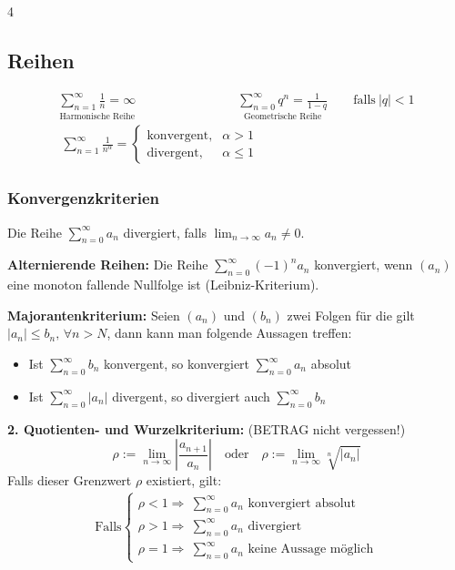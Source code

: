 \documentclass[6pt,a4paper]{scrartcl}
\newcommand{\Ra}[0]{\ensuremath{\Rightarrow}}
\begin{document}
\begin{multicols*}{4}
    \subsection{Reihen}
    \begin{eqnarray*}
        \underset{\text{Harmonische Reihe}}{\sum_{n=1}^\infty \frac{1}{n} = \infty} \qquad \qquad  \qquad \qquad \underset{\text{Geometrische Reihe}}{\sum_{n=0}^\infty q^n = \frac{1}{1-q}} \qquad \text{falls}\ |q|<1
    \end{eqnarray*}
    \begin{eqnarray*}
        \sum_{n=1}^\infty \frac{1}{n^\alpha} = \begin{cases} \text{konvergent}, & \alpha > 1 \\ \text{divergent}, & \alpha \le 1 \end{cases} \qquad \qquad \qquad \qquad \qquad \qquad
    \end{eqnarray*}

    \subsubsection{Konvergenzkriterien}

    Die Reihe $\sum^{\infty}_{n = 0} a_n$ divergiert, falls $\lim_{n\to\infty}a_n \ne 0$.

    \textbf{Alternierende Reihen:} Die Reihe \( \sum^{\infty}_{n = 0}(-1)^n a_n \) konvergiert, wenn \( (a_n) \) eine monoton fallende Nullfolge ist (Leibniz-Kriterium).

    \textbf{Majorantenkriterium:} Seien $(a_n)$ und $(b_n)$ zwei Folgen für die gilt $|a_n| \le b_n \text{, } \forall n > N$, dann kann man folgende Aussagen treffen:
    \begin{itemize}\itemsep0pt
        \item Ist $\sum_{n=0}^{\infty} b_n$ konvergent, so konvergiert $\sum_{n=0}^{\infty} a_n$ absolut
        \item Ist $\sum_{n=0}^{\infty} |a_n|$ divergent, so divergiert auch $\sum_{n=0}^{\infty} b_n$
    \end{itemize}

    \textbf{2. Quotienten- und Wurzelkriterium:} (BETRAG nicht vergessen!)
    \[
        \rho := \lim_{n \rightarrow \infty} \left| \frac{a_{n+1}}{a_n} \right| \quad \text{oder} \quad \rho := \lim_{n \rightarrow \infty} \sqrt[n]{|a_n|}
    \]
    Falls dieser Grenzwert \( \rho \) existiert, gilt:
    \begin{eqnarray*}
        \text{Falls}
        \begin{cases}
            \rho < 1 \Ra  ~\sum^\infty_{n=0} a_n \text{ konvergiert absolut} \\
            \rho > 1 \Ra  ~\sum^\infty_{n=0} a_n \text{ divergiert}          \\
            \rho = 1 \Ra  ~\sum^\infty_{n=0} a_n \text{ keine Aussage möglich}
        \end{cases}
    \end{eqnarray*}


\end{multicols*}
\end{document}
